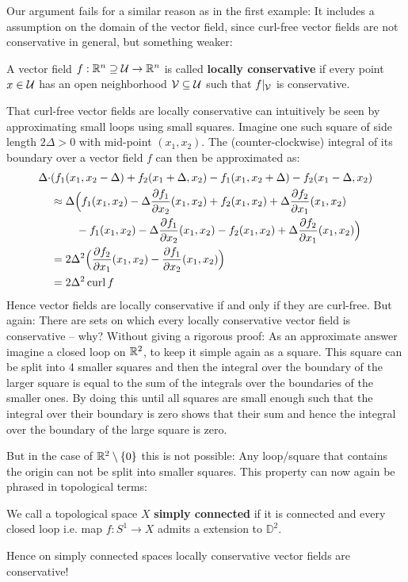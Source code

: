 Our argument fails for a similar reason as in the first example: It includes a assumption on the domain of
the vector field, since curl-free vector fields are not conservative in general, but something weaker:
\begin{definition}
A vector field $f: \mathbb{R}^n \supseteq  \mathcal{U} \to \mathbb{R}^n$ is called \textbf{locally conservative} if every point $x \in \mathcal{U}$ has an
open neighborhood $\mathcal{V} \subseteq \mathcal{U}$ such that $f|_{\mathcal{V}}$ is conservative.
\end{definition}

That curl-free vector fields are locally conservative can intuitively be seen by approximating small loops using small squares.
Imagine one such square of side length $2\Delta > 0$ with mid-point $(x_1, x_2)$. The (counter-clockwise) integral of its boundary over
a vector field $f$ can then be approximated as:
\begin{align*}
	\Delta \cdot & (  f_1(x_1, x_2 - \Delta) + f_2(x_1 + \Delta, x_2) - f_1(x_1, x_2 + \Delta) - f_2(x_1 - \Delta, x_2) \\
	&\approx \Delta \Big( f_1(x_1, x_2) - \Delta \frac{\partial f_1}{\partial x_2}(x_1, x_2) + f_2(x_1, x_2) + \Delta \frac{\partial f_2}{\partial x_1}(x_1, x_2) \\
	       & \phantom{\approx \Delta (}		   - f_1(x_1, x_2) - \Delta \frac{\partial f_1}{\partial x_2} (x_1, x_2) - f_2(x_1, x_2) + \Delta \frac{\partial f_2}{\partial x_1}(x_1, x_2) \Big) \\
	      &= 2\Delta^2 \Big( \frac{\partial f_2}{\partial x_1}(x_1, x_2) - \frac{\partial f_1}{\partial x_2}(x_1, x_2)\Big) \\
	&= 2 \Delta^2 \operatorname{curl} f
\end{align*}
Hence vector fields are locally conservative if and only if they are curl-free. But again: There are sets on which
every locally conservative vector field is conservative – why? Without giving a rigorous proof:
As an approximate answer imagine a closed loop on $\mathbb{R}^2$, to keep it simple again as a square.
This square can be split into 4 smaller squares and then the integral over the boundary of the larger square is equal to the sum
of the integrals over the boundaries of the smaller ones. By doing this until all squares
are small enough such that the integral over their boundary is zero shows that their sum and hence the integral over the boundary of
the large square is zero.

But in the case of $\mathbb{R}^2 \setminus \{0\}$ this is not possible: Any loop/square that contains the origin can not be split into smaller squares.
This property can now again be phrased in topological terms:
\begin{definition}
We call a topological space $X$ \textbf{simply connected} if it is connected and every closed loop i.e. map $f: S^1 \to X$ admits a extension to $\mathbb{D}^2$.
\end{definition}
Hence on simply connected spaces locally conservative vector fields are conservative!

